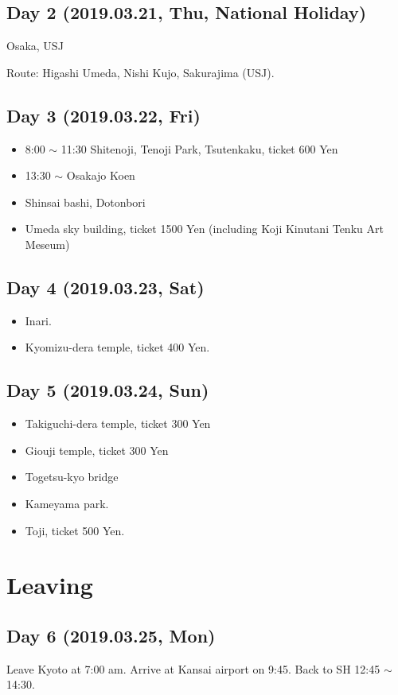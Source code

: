 \documentclass{article}
\begin{document}

\subsection{Day 2 (2019.03.21, Thu, National Holiday)}
Osaka, USJ

Route: Higashi Umeda, Nishi Kujo, Sakurajima (USJ).

\subsection{Day 3 (2019.03.22, Fri)}
\begin{itemize}
\item 8:00 $\sim$ 11:30 Shitenoji, Tenoji Park, Tsutenkaku, ticket 600 Yen
\item 13:30 $\sim$ Osakajo Koen
\item Shinsai bashi, Dotonbori
\item Umeda sky building, ticket 1500 Yen (including Koji Kinutani Tenku Art Meseum)
\end{itemize}

\subsection{Day 4 (2019.03.23, Sat)}
\begin{itemize}
\item Inari.
\item Kyomizu-dera temple, ticket 400 Yen.
\end{itemize}

\subsection{Day 5 (2019.03.24, Sun)}
\begin{itemize}
\item Takiguchi-dera temple, ticket 300 Yen
\item Giouji temple, ticket 300 Yen
\item Togetsu-kyo bridge
\item Kameyama park.
\item Toji, ticket 500 Yen.
\end{itemize}

\section{Leaving}
\subsection{Day 6 (2019.03.25, Mon)}
Leave Kyoto at 7:00 am.
Arrive at Kansai airport on 9:45.
Back to SH 12:45 $\sim $ 14:30.
\end{document}
